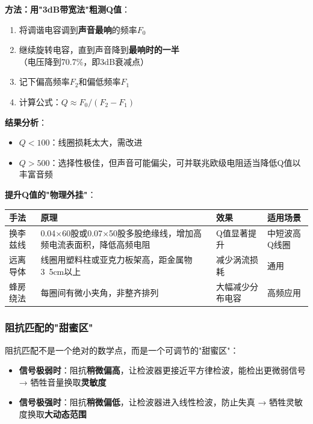 \textbf{方法：用"3dB带宽法"粗测Q值}：
\begin{enumerate}
    \item 将调谐电容调到\textbf{声音最响}的频率$F_0$
    \item 继续旋转电容，直到声音降到\textbf{最响时的一半}（电压降到70.7\%，即3dB衰减点）
    \item 记下偏高频率$F_2$和偏低频率$F_1$
    \item 计算公式：$Q \approx F_0 / (F_2 - F_1)$
\end{enumerate}

\textbf{结果分析}：
\begin{itemize}
    \item $Q < 100$：线圈损耗太大，需改进
    \item $Q > 500$：选择性极佳，但声音可能偏尖，可并联兆欧级电阻适当降低Q值以丰富音频
\end{itemize}

\textbf{提升Q值的"物理外挂"}：
\begin{center}
\begin{tabular}{|p{2.5cm}|p{4cm}|p{4cm}|p{3cm}|}
\hline
\textbf{手法} & \textbf{原理} & \textbf{效果} & \textbf{适用场景} \\
\hline
换李兹线 & 0.04$\times$60股或0.07$\times$50股多股绝缘线，增加高频电流表面积，降低高频电阻 & Q值显著提升 & 中短波高Q线圈 \\
远离导体 & 线圈用塑料柱或亚克力板架高，距金属物3~5cm以上 & 减少涡流损耗 & 通用 \\
蜂房绕法 & 每圈间有微小夹角，非整齐排列 & 大幅减少分布电容 & 高频应用 \\
\hline
\end{tabular}
\end{center}

\subsubsection{阻抗匹配的"甜蜜区"}
\label{sec:impedance_sweet_spot}

阻抗匹配不是一个绝对的数学点，而是一个可调节的"甜蜜区"：

\begin{itemize}
    \item \textbf{信号极弱时}：阻抗\textbf{稍微偏高}，让检波器更接近平方律检波，能检出更微弱信号 → 牺牲音量换取\textbf{灵敏度}
    \item \textbf{信号极强时}：阻抗\textbf{稍微偏低}，让检波器进入线性检波，防止失真 → 牺牲灵敏度换取\textbf{大动态范围}
\end{itemize}

